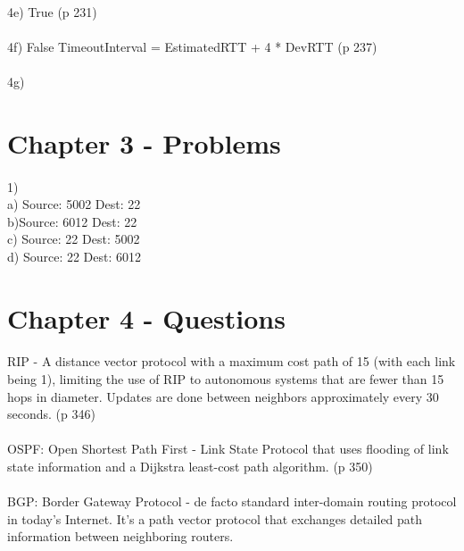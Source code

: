 \documentclass[a4paper,11pt]{article}
\begin{document}
\paragraph{}4e) True (p 231)

\paragraph{}4f) False TimeoutInterval = EstimatedRTT + 4 * DevRTT (p 237)

\paragraph{}4g)

\section{Chapter 3 - Problems}

\paragraph{}1) 
\\a) Source: 5002 Dest: 22
\\b)Source: 6012 Dest: 22
\\c) Source: 22 Dest: 5002
\\d) Source: 22 Dest: 6012

\section{Chapter 4 - Questions}
\paragraph{}RIP - A distance vector protocol with a maximum cost path of 15 (with each link being 1), limiting the use of RIP to autonomous systems that are fewer than 15 hops in diameter. Updates are done between neighbors approximately every 30 seconds. (p 346)

\paragraph{}OSPF: Open Shortest Path First - Link State Protocol that uses flooding of link state information and a Dijkstra least-cost path algorithm. (p 350)

\paragraph{}BGP: Border Gateway Protocol - de facto standard inter-domain routing protocol in today's Internet. It's a path vector protocol that exchanges detailed path information between neighboring routers.
\end{document}
